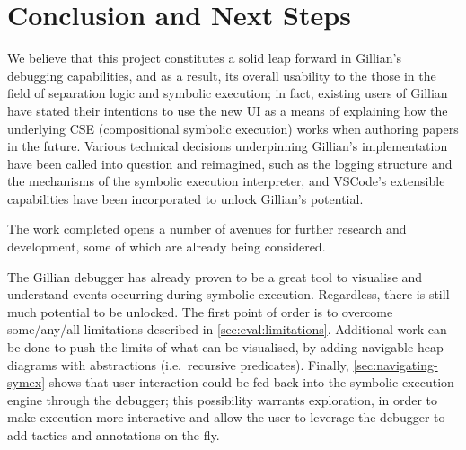 
\chapter{Conclusion and Next Steps}\label{sec:conclusion}

We believe that this project constitutes a solid leap forward in Gillian's debugging
capabilities, and as a result, its overall usability to the those in the field
of separation logic and symbolic execution; in fact, existing users of Gillian have stated their
intentions to use the new UI as a means of explaining how the underlying CSE (compositional
symbolic execution) works when authoring papers in the future. Various technical
decisions underpinning Gillian's implementation have been called into question
and reimagined, such as the logging structure and the mechanisms of the symbolic
execution interpreter, and VSCode's extensible capabilities have been
incorporated to unlock Gillian's potential.

The work completed opens a number of avenues for further research and
development, some of which are already being considered.




The Gillian debugger has already proven to be a great tool to visualise and
understand events occurring during symbolic execution. Regardless, there is
still much potential to be unlocked.
The first point of order is to overcome some/any/all limitations described in
\autoref{sec:eval:limitations}. Additional work can be done to push the limits
of what can be visualised, by adding navigable heap diagrams with abstractions
(i.e.\ recursive predicates). Finally, \autoref{sec:navigating-symex} shows that
user interaction could be fed back into the symbolic execution engine through
the debugger; this possibility warrants exploration, in order to make execution
more interactive and allow the user to leverage the debugger to add tactics and
annotations on the fly.

